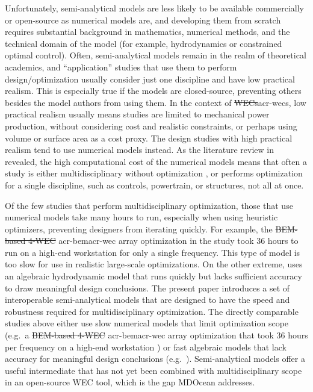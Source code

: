\documentclass[a4paper,fleqn,colorlinks,unicode,lineno]{cas-dc} %
\makeatletter
\providecommand{\DIFaddtex}[1]{{\protect\color{blue}\uwave{#1}}} %
\providecommand{\DIFdeltex}[1]{{\protect\color{red}\sout{#1}}} %
\providecommand{\DIFaddbegin}{} %
\providecommand{\DIFaddend}{} %
\providecommand{\DIFdelbegin}{} %
\providecommand{\DIFdelend}{} %
\providecommand{\DIFadd}[1]{\texorpdfstring{\DIFaddtex{#1}}{#1}} %
\providecommand{\DIFdel}[1]{\texorpdfstring{\DIFdeltex{#1}}{}} %
\providecommand{\DIFscaledelfig}{0.5}
\newlength{\DIFdelgraphicswidth} %
\newlength{\DIFdelgraphicsheight} %
\providecommand{\DIFaddincludegraphics}[2][]{{\color{blue}\fbox{\DIFOincludegraphics[#1]{#2}}}} %
\providecommand{\DIFdelincludegraphics}[2][]{%
\sbox{\DIFdelgraphicsbox}{\DIFOincludegraphics[#1]{#2}}%
\settoboxwidth{\DIFdelgraphicswidth}{\DIFdelgraphicsbox} %
\settoboxtotalheight{\DIFdelgraphicsheight}{\DIFdelgraphicsbox} %
\scalebox{\DIFscaledelfig}{%
\parbox[b]{\DIFdelgraphicswidth}{\usebox{\DIFdelgraphicsbox}\\[-\baselineskip] \rule{\DIFdelgraphicswidth}{0em}}\llap{\resizebox{\DIFdelgraphicswidth}{\DIFdelgraphicsheight}{%
\setlength{\unitlength}{\DIFdelgraphicswidth}%
\begin{picture}(1,1)%
\thicklines\linethickness{2pt} %
{\color[rgb]{1,0,0}\put(0,0){\framebox(1,1){}}}%
{\color[rgb]{1,0,0}\put(0,0){\line( 1,1){1}}}%
{\color[rgb]{1,0,0}\put(0,1){\line(1,-1){1}}}%
\end{picture}%
}\hspace*{3pt}}} %
} %
\DeclareRobustCommand{\DIFaddbegin}{\DIFOaddbegin \let\includegraphics\DIFaddincludegraphics} %
\DeclareRobustCommand{\DIFaddend}{\DIFOaddend \let\includegraphics\DIFOincludegraphics} %
\DeclareRobustCommand{\DIFdelbegin}{\DIFOdelbegin \let\includegraphics\DIFdelincludegraphics} %
\DeclareRobustCommand{\DIFdelend}{\DIFOaddend \let\includegraphics\DIFOincludegraphics} %
\let\sout@orig\sout %
\renewcommand{\sout}[1]{\ifmmode\text{\sout@orig{\ensuremath{#1}}}\else\sout@orig{#1}\fi} %
\makeatother
\begin{document}
    Unfortunately, semi-analytical models are less likely to be available commercially or open-source as numerical models are, and developing them from scratch requires substantial background in mathematics, numerical methods, and the technical domain of the model (for example, hydrodynamics or constrained optimal control).
    Often, semi-analytical models remain in the realm of theoretical academics, and ``application'' studies that use them to perform design/optimization usually consider just one discipline and have low practical realism.
    This is especially true if the models are closed-source, preventing others besides the model authors from using them.
    In the context of \DIFdelbegin \DIFdel{WECs}\DIFdelend \DIFaddbegin \glspl{acr-wec}\DIFaddend , low practical realism usually means studies are limited to mechanical power production, without considering cost and realistic constraints, or perhaps using volume or surface area as a cost proxy.
    The design studies with high practical realism tend to use numerical models instead.
    As the literature review in  revealed, the high computational cost of the numerical models means that often a study is either multidisciplinary without optimization \citep{RM3,mi_multi-scale_2025}, or performs optimization for a single discipline, such as controls, powertrain, or structures, not all at once.

    Of the few studies that perform multidisciplinary optimization, those that use numerical models take many hours to run, especially when using heuristic optimizers, preventing designers from iterating quickly.
    For example, the \DIFdelbegin \DIFdel{BEM-based 4-WEC }\DIFdelend \DIFaddbegin \gls{acr-bem}\DIFadd{-based 4-}\gls{acr-wec} \DIFaddend array optimization in the study \citep{khanal_multi-objective_2024} took 36 hours to run on a high-end workstation for only a single frequency.
    This type of model is too slow for use in realistic large-scale optimizations.
    On the other extreme, \citet{mccabe_multidisciplinary_2022} uses an algebraic hydrodynamic model that runs quickly but lacks sufficient accuracy to draw meaningful design conclusions.
    The present paper introduces a set of interoperable semi-analytical models that are designed to have the speed and robustness required for multidisciplinary optimization.
\else
    The directly comparable studies above either use slow numerical models that limit optimization scope (e.g.\ a \DIFdelbegin \DIFdel{BEM-based 4-WEC }\DIFdelend \DIFaddbegin \gls{acr-bem}\DIFadd{-based 4-}\gls{acr-wec} \DIFaddend array optimization that took 36 hours per frequency on a high-end workstation \citep{khanal_multi-objective_2024}) or fast algebraic models that lack accuracy for meaningful design conclusions (e.g.\ \citep{mccabe_multidisciplinary_2022}).
    Semi-analytical models offer a useful intermediate that has not yet been combined with multidisciplinary scope in an open-source WEC tool, which is the gap MDOcean addresses.
\fi
\end{document}
